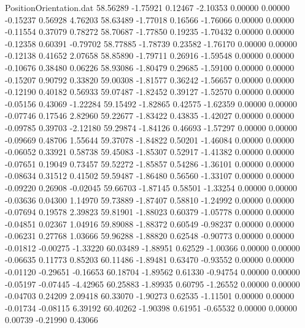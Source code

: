 \begin{filecontents}{PositionOrientation.dat}
  58.56289   -1.75921    0.12467    -2.10353    0.00000    0.00000   -0.15237    0.56928    4.76203
  58.63489   -1.77018    0.16566    -1.76066    0.00000    0.00000   -0.11554    0.37079    0.78272
  58.70687   -1.77850    0.19235    -1.70432    0.00000    0.00000   -0.12358    0.60391   -0.79702
  58.77885   -1.78739    0.23582    -1.76170    0.00000    0.00000   -0.12138    0.41652    2.07658
  58.85890   -1.79711    0.26916    -1.59548    0.00000    0.00000   -0.10676    0.38480    0.06226
  58.93086   -1.80479    0.29685    -1.59100    0.00000    0.00000   -0.15207    0.90792    0.33820
  59.00308   -1.81577    0.36242    -1.56657    0.00000    0.00000   -0.12190    0.40182    0.56933
  59.07487   -1.82452    0.39127    -1.52570    0.00000    0.00000   -0.05156    0.43069   -1.22284
  59.15492   -1.82865    0.42575    -1.62359    0.00000    0.00000   -0.07746    0.17546    2.82960
  59.22677   -1.83422    0.43835    -1.42027    0.00000    0.00000   -0.09785    0.39703   -2.12180
  59.29874   -1.84126    0.46693    -1.57297    0.00000    0.00000   -0.09669    0.48706    1.55644
  59.37078   -1.84822    0.50201    -1.46084    0.00000    0.00000   -0.06052    0.33921    0.58738
  59.45083   -1.85307    0.52917    -1.41382    0.00000    0.00000   -0.07651    0.19049    0.73457
  59.52272   -1.85857    0.54286    -1.36101    0.00000    0.00000   -0.08634    0.31512    0.41502
  59.59487   -1.86480    0.56560    -1.33107    0.00000    0.00000   -0.09220    0.26908   -0.02045
  59.66703   -1.87145    0.58501    -1.33254    0.00000    0.00000   -0.03636    0.04300    1.14970
  59.73889   -1.87407    0.58810    -1.24992    0.00000    0.00000   -0.07694    0.19578    2.39823
  59.81901   -1.88023    0.60379    -1.05778    0.00000    0.00000   -0.04851    0.02367    1.04916
  59.89088   -1.88372    0.60549    -0.98237    0.00000    0.00000   -0.06231    0.27768    1.03666
  59.96288   -1.88820    0.62548    -0.90773    0.00000    0.00000   -0.01812   -0.00275   -1.33220
  60.03489   -1.88951    0.62529    -1.00366    0.00000    0.00000   -0.06635    0.11773    0.85203
  60.11486   -1.89481    0.63470    -0.93552    0.00000    0.00000   -0.01120   -0.29651   -0.16653
  60.18704   -1.89562    0.61330    -0.94754    0.00000    0.00000   -0.05197   -0.07445   -4.42965
  60.25883   -1.89935    0.60795    -1.26552    0.00000    0.00000   -0.04703    0.24209    2.09418
  60.33070   -1.90273    0.62535    -1.11501    0.00000    0.00000   -0.01734   -0.08115    6.39192
  60.40262   -1.90398    0.61951    -0.65532    0.00000    0.00000    0.00739   -0.21990    0.43066

\end{filecontents}
